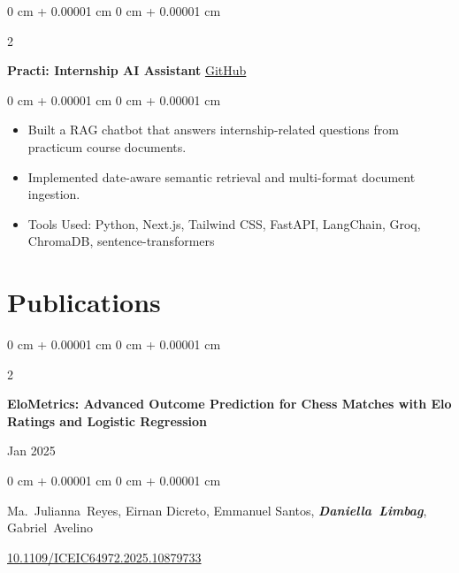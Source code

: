 \documentclass[10pt, letterpaper]{article}
\newenvironment{highlights}{
    \begin{itemize}[
        topsep=0.04 cm,
        parsep=0.04 cm,
        partopsep=0pt,
        itemsep=0pt,
        leftmargin=0 cm + 10pt
    ]
}{
    \end{itemize}
} %
\newenvironment{onecolentry}{
    \begin{adjustwidth}{
        0 cm + 0.00001 cm
    }{
        0 cm + 0.00001 cm
    }
}{
    \end{adjustwidth}
} %
\newenvironment{twocolentry}[2][]{
    \onecolentry
    \def\secondColumn{#2}
    \setcolumnwidth{\fill, 4.5 cm}
    \begin{paracol}{2}
}{
    \switchcolumn \raggedleft \secondColumn
    \end{paracol}
    \endonecolentry
} %
\begin{document}
        \begin{twocolentry}{
            \href{https://github.com/daniellalimbag/practi}{GitHub}
        }
        \textbf{Practi: Internship AI Assistant}\end{twocolentry}
        \vspace{0.05 cm}
        \begin{onecolentry}
            \begin{highlights}
            \item Built a RAG chatbot that answers internship-related questions from practicum course documents.
            \item Implemented date-aware semantic retrieval and multi-format document ingestion.
            \item Tools Used: Python, Next.js, Tailwind CSS, FastAPI, LangChain, Groq, ChromaDB, sentence-transformers
            \end{highlights}
        \end{onecolentry}

    \section{Publications}
        \begin{samepage}
            \begin{twocolentry}{
                Jan 2025
            }
                \textbf{EloMetrics: Advanced Outcome Prediction for Chess Matches with Elo Ratings and Logistic Regression}
            \end{twocolentry}

            \vspace{0.05 cm}

            \begin{onecolentry}
                \mbox{Ma. Julianna Reyes}, {Eirnan Dicreto}, {Emmanuel Santos}, \mbox{\textbf{\textit{Daniella Limbag}}}, \mbox{Gabriel Avelino}

                \vspace{0.05 cm}

        \href{https://doi.org/10.1109/ICEIC64972.2025.10879733}{10.1109/ICEIC64972.2025.10879733}
        \end{onecolentry}
        \end{samepage}
\end{document}
